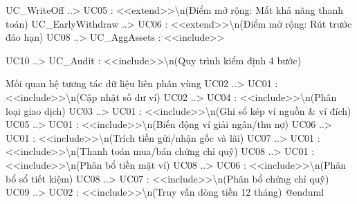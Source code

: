 \documentclass[11pt,a4paper]{article}
\newenvironment{Shaded}{}{}
\newcommand{\NormalTok}[1]{#1}
\begin{document}
\begin{Shaded}
\begin{Highlighting}[]
\NormalTok{UC\_WriteOff ..\textgreater{} UC05 : \textless{}\textless{}extend\textgreater{}\textgreater{}\textbackslash{}n(Điểm mở rộng: Mất khả năng thanh toán)}
\NormalTok{UC\_EarlyWithdraw ..\textgreater{} UC06 : \textless{}\textless{}extend\textgreater{}\textgreater{}\textbackslash{}n(Điểm mở rộng: Rút trước đáo hạn)}
\NormalTok{UC08 ..\textgreater{} UC\_AggAssets : \textless{}\textless{}include\textgreater{}\textgreater{}}

\NormalTok{UC10 ..\textgreater{} UC\_Audit : \textless{}\textless{}include\textgreater{}\textgreater{}\textbackslash{}n(Quy trình kiểm định 4 bước)}

\NormalTok{\textquotesingle{} Mối quan hệ tương tác dữ liệu liên phân vùng}
\NormalTok{UC02 ..\textgreater{} UC01 : \textless{}\textless{}include\textgreater{}\textgreater{}\textbackslash{}n(Cập nhật số dư ví)}
\NormalTok{UC02 ..\textgreater{} UC04 : \textless{}\textless{}include\textgreater{}\textgreater{}\textbackslash{}n(Phân loại giao dịch)}
\NormalTok{UC03 ..\textgreater{} UC01 : \textless{}\textless{}include\textgreater{}\textgreater{}\textbackslash{}n(Ghi sổ kép ví nguồn \& ví đích)}
\NormalTok{UC05 ..\textgreater{} UC01 : \textless{}\textless{}include\textgreater{}\textgreater{}\textbackslash{}n(Biến động ví giải ngân/thu nợ)}
\NormalTok{UC06 ..\textgreater{} UC01 : \textless{}\textless{}include\textgreater{}\textgreater{}\textbackslash{}n(Trích tiền gửi/nhận gốc và lãi)}
\NormalTok{UC07 ..\textgreater{} UC01 : \textless{}\textless{}include\textgreater{}\textgreater{}\textbackslash{}n(Thanh toán mua/bán chứng chỉ quỹ)}
\NormalTok{UC08 ..\textgreater{} UC01 : \textless{}\textless{}include\textgreater{}\textgreater{}\textbackslash{}n(Phân bổ tiền mặt ví)}
\NormalTok{UC08 ..\textgreater{} UC06 : \textless{}\textless{}include\textgreater{}\textgreater{}\textbackslash{}n(Phân bổ sổ tiết kiệm)}
\NormalTok{UC08 ..\textgreater{} UC07 : \textless{}\textless{}include\textgreater{}\textgreater{}\textbackslash{}n(Phân bổ chứng chỉ quỹ)}
\NormalTok{UC09 ..\textgreater{} UC02 : \textless{}\textless{}include\textgreater{}\textgreater{}\textbackslash{}n(Truy vấn dòng tiền 12 tháng)}
\NormalTok{@enduml}
\end{Highlighting}
\end{Shaded}
\fi
\end{document}
